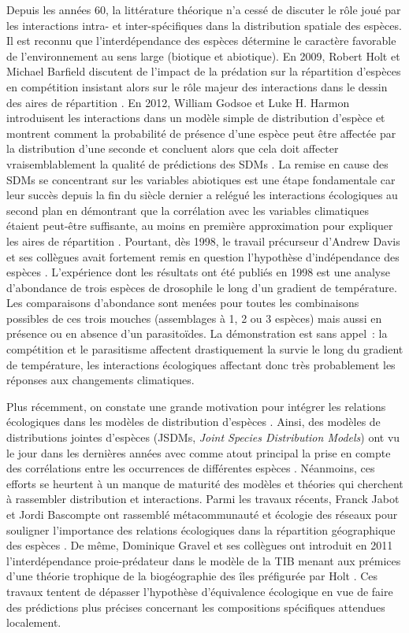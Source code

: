 Depuis les années 60, la littérature théorique n'a cessé de discuter le
rôle joué par les interactions intra- et inter-spécifiques dans la
distribution spatiale des espèces. Il est reconnu que l'interdépendance
des espèces détermine le caractère favorable de l'environnement au sens
large (biotique et abiotique). En 2009, Robert Holt et Michael Barfield
discutent de l'impact de la prédation sur la répartition d'espèces en
compétition insistant alors sur le rôle majeur des interactions dans le
dessin des aires de répartition \citep{Holt2009}. En 2012, William
Godsoe et Luke H. Harmon introduisent les interactions dans un modèle
simple de distribution d'espèce et montrent comment la probabilité de
présence d'une espèce peut être affectée par la distribution d'une
seconde et concluent alors que cela doit affecter vraisemblablement la
qualité de prédictions des SDMs \citep{Godsoe2012}. La remise en cause
des SDMs se concentrant sur les variables abiotiques est une étape
fondamentale car leur succès depuis la fin du siècle dernier a relégué
les interactions écologiques au second plan en démontrant que la
corrélation avec les variables climatiques étaient peut-être suffisante,
au moins en première approximation pour expliquer les aires de
répartition \citep{Pearson2003}. Pourtant, dès 1998, le travail
précurseur d'Andrew Davis et ses collègues \citep{Davis1998} avait
fortement remis en question l'hypothèse d'indépendance des espèces
\citep{Jeschke2008}. L'expérience dont les résultats ont été publiés en
1998 est une analyse d'abondance de trois espèces de drosophile le long
d'un gradient de température. Les comparaisons d'abondance sont menées
pour toutes les combinaisons possibles de ces trois mouches (assemblages
à 1, 2 ou 3 espèces) mais aussi en présence ou en absence d'un
parasitoïdes. La démonstration est sans appel~: la compétition et le
parasitisme affectent drastiquement la survie le long du gradient de
température, les interactions écologiques affectant donc très
probablement les réponses aux changements climatiques.

Plus récemment, on constate une grande motivation pour intégrer les
relations écologiques dans les modèles de distribution d'espèces
\citep{Kissling2012, Guisan2011}. Ainsi, des modèles de distributions
jointes d'espèces (JSDMs, \emph{Joint Species Distribution Models}) ont
vu le jour dans les dernières années avec comme atout principal la prise
en compte des corrélations entre les occurrences de différentes espèces
\citep{Pollock2014, Ovaskainen2010}. Néanmoins, ces efforts se heurtent
à un manque de maturité des modèles et théories qui cherchent à
rassembler distribution et interactions. Parmi les travaux récents,
Franck Jabot et Jordi Bascompte ont rassemblé métacommunauté et écologie
des réseaux pour souligner l'importance des relations écologiques dans
la répartition géographique des espèces \citep{Jabot2012}. De même,
Dominique Gravel et ses collègues ont introduit en 2011
l'interdépendance proie-prédateur dans le modèle de la TIB menant aux
prémices d'une théorie trophique de la biogéographie des îles
\citep{Gravel2011} préfigurée par Holt \citep{Holt2009a}. Ces travaux
tentent de dépasser l'hypothèse d'équivalence écologique en vue de faire
des prédictions plus précises concernant les compositions spécifiques
attendues localement.

